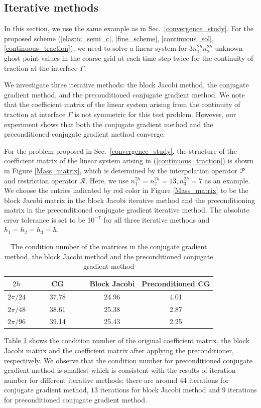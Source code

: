 \subsection{Iterative methods}\label{iterative_section}
In this section, we use the same example as in Sec.~\ref{convergence_study}. For the proposed scheme (\ref{elastic_semi_c}, \ref{fine_scheme}, \ref{continuous_sol}, \ref{continuous_traction}), we need to solve a linear system for $3n_1^{2h}n_2^{2h}$ unknown ghost point values in the coarse grid at each time step twice for the continuity of traction at the interface $\Gamma$. 

We investigate three iterative methods: the block Jacobi method, the conjugate gradient method, and the preconditioned conjugate gradient method. We note that the coefficient matrix of the linear system arising from the continuity of traction at interface $\Gamma$ is not symmetric for this test problem. However, our experiment shows that both the conjugate gradient method and the preconditioned conjugate gradient method converge.

For the problem proposed in Sec.~\ref{convergence_study}, the structure of the coefficient matrix of the linear system arising in (\ref{continuous_traction}) is shown in Figure \ref{Mass_matrix}, which is determined by the interpolation operator ${\mathcal{P}}$ and restriction operator ${\mathcal{R}}$. Here, we use $n_1^{2h} = n_2^{2h}=13, n_3^{2h} = 7$ as an example. We choose the entries indicated by red color in Figure \ref{Mass_matrix} to be the block Jacobi matrix in the block Jacobi iterative method and the preconditioning matrix in the preconditioned conjugate gradient iterative method. The absolute error tolerance is set to be $10^{-7}$ for all three iterative methods and $h_1 = h_2 = h_3 = h$.

\begin{table}[htbp]
	\begin{center}
		\begin{tabular}{|c|c c c|}
			\hline
			$2h$   & ~~~~ CG ~~~~& Block Jacobi & Preconditioned CG  \\
			\hline
			$2\pi/24$ &37.78& 24.96& 4.01\\
			\hline
			$2\pi/48$ &38.61 & 25.38 & 2.87\\
			\hline 
			$2\pi/96$ &39.14 &25.43 & 2.25\\
			\hline
		\end{tabular}
	\end{center}
	\caption{The condition number of the matrices in the conjugate gradient method, the block Jacobi method and the preconditioned conjugate gradient method}\label{condition_number}
\end{table} 
Table \ref{condition_number} shows the condition number of the original coefficient matrix, the block Jacobi matrix and the coefficient matrix after applying the preconditioner, respectively. We observe that the condition number for preconditioned conjugate gradient method is smallest which is consistent with the results of iteration number for different iterative methods: there are around $44$ iterations for conjugate gradient method, $13$ iterations for block Jacobi method and $9$ iterations for preconditioned conjugate gradient method.

